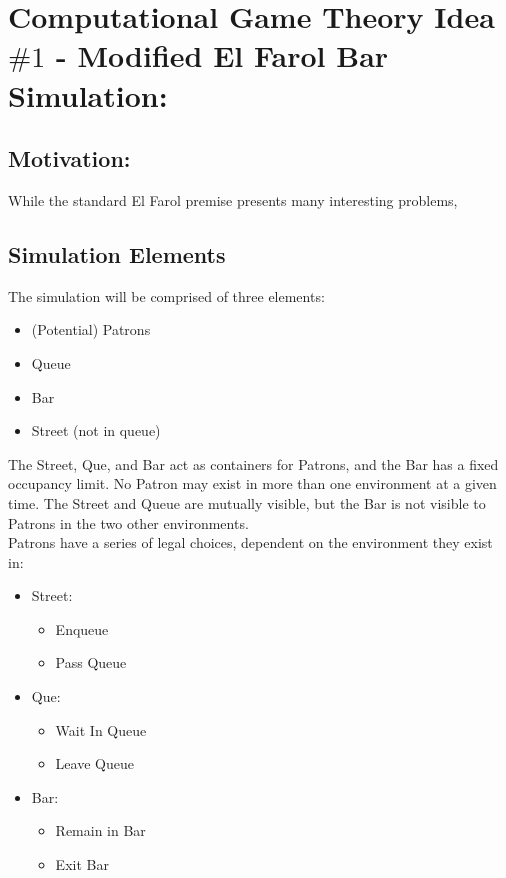 \documentclass[10pt]{article}
\begin{document}
\section{Computational Game Theory Idea $\#1$ - Modified El Farol Bar Simulation:}

\subsection{Motivation:} 
While the standard El Farol premise presents many interesting problems,
\subsection{Simulation Elements}
The simulation will be comprised of three elements:
\begin{itemize}
\item (Potential) Patrons
\item Queue
\item Bar
\item Street (not in queue)
\end{itemize}

The Street, Que, and Bar act as containers for Patrons, and the Bar has a fixed occupancy limit. No Patron may exist in more than one environment at a given time. The Street and Queue are mutually visible, but the Bar is not visible to Patrons in the two other environments. \\
Patrons have a series of legal choices, dependent on the environment they exist in:
\begin{itemize}
\item Street:
\begin{itemize}
\item Enqueue
\item Pass Queue
\end{itemize}
\item Que:
\begin{itemize}
\item Wait In Queue
\item Leave Queue
\end{itemize}
\item Bar:
\begin{itemize}
\item Remain in Bar
\item Exit Bar
\end{itemize}
\end{itemize}
\end{document}
